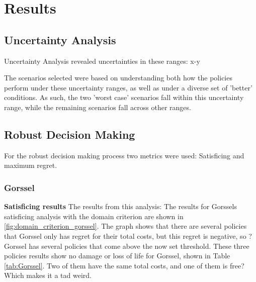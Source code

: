 \section{Results}
\label{s:results}


\subsection{Uncertainty Analysis}
Uncertainty Analysis revealed uncertainties in these ranges: x-y

The scenarios selected were based on understanding both how the policies perform under these uncertainty ranges, as well as under a diverse set of 'better' conditions. As such, the two 'worst case' scenarios fall within this uncertainty range, while the remaining scenarios fall across other ranges.


\subsection{Robust Decision Making}
For the robust decision making process two metrics were used: Satisficing and maximum regret. 
\subsubsection{Gorssel}
\textbf{Satisficing results} \newline
The results from this analysis: The results for Gorssels satisficing analysis with the domain criterion are shown in \autoref{fig:domain_criterion_gorssel}. The graph shows that there are several policies that 
Gorssel only has regret for their total costs, but this regret is negative, so ?
Gorssel has several policies that come above the now set threshold. These three policies results show no damage or loss of life for Gorssel, shown in Table \ref{tab:Gorssel}. Two of them have the same total costs, and one of them is free? Which makes it a tad weird. 

